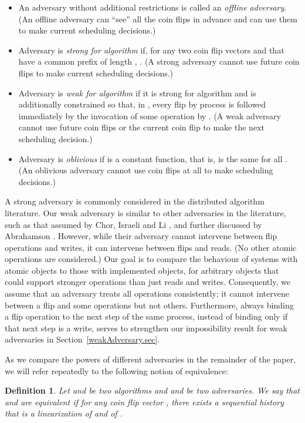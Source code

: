 \documentclass[11pt,letterpaper]{article}
\newtheorem{definition}[theorem]{Definition}
\begin{document}
\vspace{-2pt}
\begin{itemize}
\setlength{\itemsep}{-2.8pt}
\item
An adversary without additional restrictions is called an \emph{offline adversary}.
(An offline adversary can ``see'' all the coin flips in advance and can use them to make current scheduling decisions.)
\item
Adversary  is \emph{strong for algorithm }
if, for any two coin flip vectors  and  that have a common prefix of length ,
 .
(A strong adversary cannot use future coin flips to make current scheduling decisions.)
\item
Adversary  is \emph{weak for algorithm }
if it is  strong for algorithm  and is additionally constrained so that,
in , every flip by process  is followed immediately by the invocation of some operation by .
(A weak adversary cannot use future coin flips or the current coin flip to make the next scheduling decision.)
\item
Adversary  is \emph{oblivious} if  is a constant function, that is,  is the same for all .
(An oblivious adversary cannot use coin flips at all to make scheduling decisions.)
\end{itemize}

A strong adversary is commonly considered in the distributed algorithm literature.
Our weak adversary is similar to other adversaries in the literature,
such as that assumed by Chor, Israeli and Li \cite{CIL1987_PODC},
and further discussed by Abrahamson \cite{Abrahamson88_PODC}.
However, while their adversary cannot intervene between flip operations and writes,
it can intervene between flips and reads. (No other atomic operations are considered.)
Our goal is to compare the behaviour of systems with atomic objects to those with implemented objects,
for arbitrary objects that could support stronger operations than just reads and writes.
Consequently, we assume that an adversary treats all operations consistently;
it cannot intervene between a flip and some operations but not others.
Furthermore, always binding a flip operation to the next step of the same process,
instead of binding only if that next step is a write,
serves to strengthen our impossibility result for weak adversaries in Section~\ref{weakAdversary.sec}.

As we compare the powers of different adversaries in the remainder of the paper,
we will refer repeatedly to the following notion of equivalence:
\begin{definition}\label{def_advequiv}
  Let  and  be two algorithms and  and  be two adversaries.
  We say that  and  are \emph{equivalent}
  if for any coin flip vector ,
  there exists a sequential history that is a linearization of  and
  of .
\end{definition}
\end{document}
